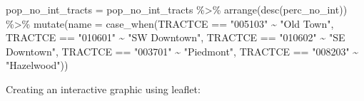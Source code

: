 \documentclass[
]{article}
\newenvironment{Shaded}{\begin{snugshade}}{\end{snugshade}}
\newcommand{\AttributeTok}[1]{\textcolor[rgb]{0.77,0.63,0.00}{#1}}
\newcommand{\FunctionTok}[1]{\textcolor[rgb]{0.00,0.00,0.00}{#1}}
\newcommand{\NormalTok}[1]{#1}
\newcommand{\OtherTok}[1]{\textcolor[rgb]{0.56,0.35,0.01}{#1}}
\newcommand{\SpecialCharTok}[1]{\textcolor[rgb]{0.00,0.00,0.00}{#1}}
\newcommand{\StringTok}[1]{\textcolor[rgb]{0.31,0.60,0.02}{#1}}
\begin{document}
\begin{Shaded}
\begin{Highlighting}[]
  
\NormalTok{pop\_no\_int\_tracts }\OtherTok{=}\NormalTok{ pop\_no\_int\_tracts }\SpecialCharTok{\%\textgreater{}\%} 
                      \FunctionTok{arrange}\NormalTok{(}\FunctionTok{desc}\NormalTok{(perc\_no\_int)) }\SpecialCharTok{\%\textgreater{}\%} 
                          \FunctionTok{mutate}\NormalTok{(}\AttributeTok{name =} \FunctionTok{case\_when}\NormalTok{(TRACTCE }\SpecialCharTok{==} \StringTok{"005103"} \SpecialCharTok{\textasciitilde{}} \StringTok{"Old Town"}\NormalTok{,}
\NormalTok{                                                  TRACTCE }\SpecialCharTok{==} \StringTok{"010601"} \SpecialCharTok{\textasciitilde{}} \StringTok{"SW Downtown"}\NormalTok{, }
\NormalTok{                                                  TRACTCE }\SpecialCharTok{==} \StringTok{"010602"} \SpecialCharTok{\textasciitilde{}} \StringTok{"SE Downtown"}\NormalTok{, }
\NormalTok{                                                  TRACTCE }\SpecialCharTok{==} \StringTok{"003701"} \SpecialCharTok{\textasciitilde{}} \StringTok{"Piedmont"}\NormalTok{, }
\NormalTok{                                                  TRACTCE }\SpecialCharTok{==} \StringTok{"008203"} \SpecialCharTok{\textasciitilde{}} \StringTok{"Hazelwood"}\NormalTok{))}
\end{Highlighting}
\end{Shaded}

Creating an interactive graphic using leaflet:
\end{document}

